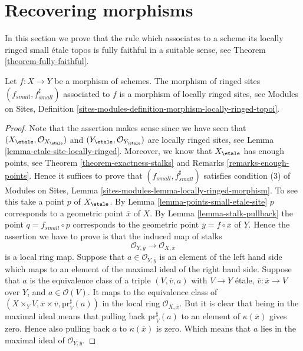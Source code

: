 \section{Recovering morphisms}
\label{section-morphisms}

\noindent
In this section we prove that the rule which associates to a scheme
its locally ringed small \'etale topos is fully faithful in a suitable
sense, see
Theorem \ref{theorem-fully-faithful}.

\begin{lemma}
\label{lemma-morphism-locally-ringed}
Let $f : X \to Y$ be a morphism of schemes.
The morphism of ringed sites $(f_{small}, f_{small}^\sharp)$
associated to $f$ is a morphism of locally ringed sites, see
Modules on Sites,
Definition \ref{sites-modules-definition-morphism-locally-ringed-topoi}.
\end{lemma}

\begin{proof}
Note that the assertion makes sense since we have seen that
$(X_\etale, \mathcal{O}_{X_\etale})$ and
$(Y_\etale, \mathcal{O}_{Y_\etale})$
are locally ringed sites, see
Lemma \ref{lemma-etale-site-locally-ringed}.
Moreover, we know that $X_\etale$ has enough points, see
Theorem \ref{theorem-exactness-stalks}
and
Remarks \ref{remarks-enough-points}.
Hence it suffices to prove that $(f_{small}, f_{small}^\sharp)$
satisfies condition (3) of
Modules on Sites,
Lemma \ref{sites-modules-lemma-locally-ringed-morphism}.
To see this take a point $p$ of $X_\etale$. By
Lemma \ref{lemma-points-small-etale-site}
$p$ corresponds to a geometric point $\overline{x}$ of $X$.
By
Lemma \ref{lemma-stalk-pullback}
the point $q = f_{small} \circ p$ corresponds to the
geometric point $\overline{y} = f \circ \overline{x}$ of $Y$.
Hence the assertion we have to prove is that the induced map
of stalks
$$
\mathcal{O}_{Y, \overline{y}} \longrightarrow \mathcal{O}_{X, \overline{x}}
$$
is a local ring map. Suppose that $a \in \mathcal{O}_{Y, \overline{y}}$
is an element of the left hand side which maps to an element of the maximal
ideal of the right hand side. Suppose that $a$ is the equivalence class
of a triple $(V, \overline{v}, a)$ with $V \to Y$ \'etale,
$\overline{v} : \overline{x} \to V$ over $Y$, and $a \in \mathcal{O}(V)$.
It maps to the equivalence class of
$(X \times_Y V, \overline{x} \times \overline{v}, \text{pr}_V^\sharp(a))$
in the local ring $\mathcal{O}_{X, \overline{x}}$. But it is clear that
being in the maximal ideal means that pulling back $\text{pr}_V^\sharp(a)$
to an element of $\kappa(\overline{x})$ gives zero. Hence also pulling back
$a$ to $\kappa(\overline{x})$ is zero. Which means that $a$ lies in the
maximal ideal of $\mathcal{O}_{Y, \overline{y}}$.
\end{proof}

